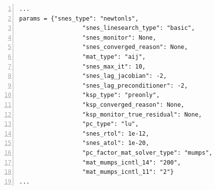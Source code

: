 \documentclass[format=acmsmall,screen,timestamp=false,a4paper]{acmart}
\newcommand\josh[1]{\textbf{\textcolor[rgb]{0,.5,1}{[Josh: #1]}}}
\newcommand\lm[1]{\textbf{\textcolor[rgb]{1,0,0.5}{[Lawrence: #1]}}}
\begin{document}
\begin{lstlisting}[float=htbp,caption={An example of some solver parameters that we can use for the mixed Poisson problem.  The options presented here solve the algebraic system with a simplified Newton method where the Jacobian is held constant at the first iterate.  Therefore it is factored at the beginning and triangular solves are applied to it at each subsequent iteration.  This has the effect of performing iterative refinement \cite{wilkinson1994rounding}, \cite{moler1967iterative} and yields an increased accuracy for higher order discretizations on finer meshes.}, label={lst:solver_parameters}, numbers=left, firstnumber=1, xleftmargin=20pt,  xrightmargin=20pt]
...
params = {"snes_type": "newtonls",
                  "snes_linesearch_type": "basic",
                  "snes_monitor": None,
                  "snes_converged_reason": None,
                  "mat_type": "aij",
                  "snes_max_it": 10,
                  "snes_lag_jacobian": -2,
                  "snes_lag_preconditioner": -2,
                  "ksp_type": "preonly",
                  "ksp_converged_reason": None,
                  "ksp_monitor_true_residual": None,
                  "pc_type": "lu",
                  "snes_rtol": 1e-12,
                  "snes_atol": 1e-20,
                  "pc_factor_mat_solver_type": "mumps",
                  "mat_mumps_icntl_14": "200",
                  "mat_mumps_icntl_11": "2"}
...
\end{lstlisting}




\end{document}

